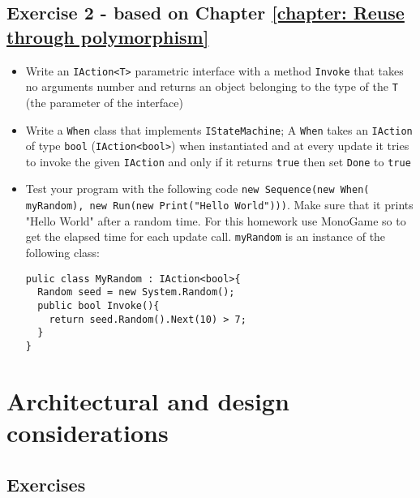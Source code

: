     \section{Exercise 2 - \small based on Chapter \ref{chapter: Reuse through polymorphism}}
	     \begin{myprop}
         \begin{itemize}
         	\item Write an \texttt{IAction<T>} parametric interface with a method \texttt{Invoke} that takes no arguments number and returns an object belonging to the type of the \texttt{T} (the parameter of the interface)
         	\item Write a \texttt{When} class that implements \texttt{IStateMachine}; A \texttt{When} takes an \texttt{IAction} of type \texttt{bool} (\texttt{IAction<bool>}) when instantiated and at every update it tries to invoke the given \texttt{IAction} and only if it returns \texttt{true} then set \texttt{Done} to \texttt{true}
         	\item Test your program with the following code \texttt{new Sequence(new When(}\\ \texttt{myRandom), new Run(new Print("Hello World")))}. Make sure that it prints "Hello World" after a random time. For this homework use MonoGame so to get the elapsed time for each update call. \texttt{myRandom} is an instance of the following class:
\begin{lstlisting}         	
pulic class MyRandom : IAction<bool>{
  Random seed = new System.Random();
  public bool Invoke(){ 
    return seed.Random().Next(10) > 7; 
  }
}
\end{lstlisting}
		\end{itemize}
	     \end{myprop}
         	



\chapter{Architectural and design considerations}
    \section{Exercises}


